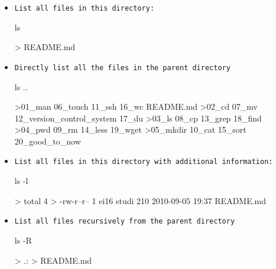 \documentclass[10pt,a4paper]{scrartcl}
\begin{document}
\begin{itemize}

\item \texttt{List all files in this directory:}
\begin{terminalcode}
ls 

> README.md
\end{terminalcode}


\item \texttt{Directly list all the files in the parent directory}

\begin{terminalcode}
ls ..

>01_man    06_touch  11_ssh                     16_wc           README.md
>02_cd     07_mv     12_version_control_system  17_du
>03_ls     08_cp     13_grep                    18_find
>04_pwd    09_rm     14_less                    19_wget
>05_mkdir  10_cat    15_sort                    20_good_to_now

\end{terminalcode}


\item \texttt{List all files in this directory with additional information:}
\begin{terminalcode}
ls -l

> total 4
> -rw-r--r-- 1 ei16 studi 210 2010-09-05 19:37 README.md

\end{terminalcode}


\item \texttt{List all files recursively from the parent directory}
\begin{terminalcode}
ls -R

> .:
> README.md
\end{terminalcode}
\end{itemize}



\end{document}
